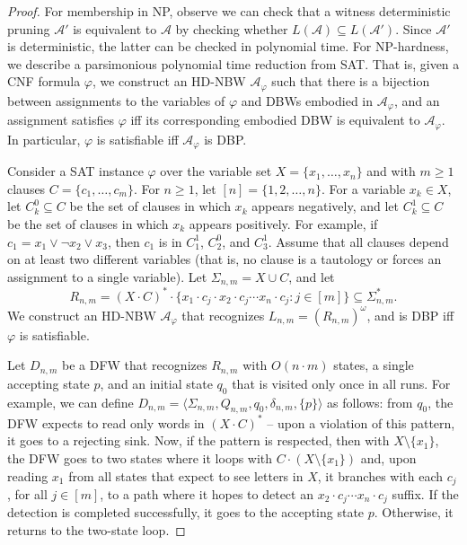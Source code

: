 \documentclass[10pt,a4paper]{amsart}
\theoremstyle{definition}
\numberwithin{equation}{section}
\newcommand{\A}{{\mathcal A}}
\begin{document}
\begin{proof}
For membership in NP, observe we can check that a witness deterministic pruning $\A'$ is equivalent to $\A$ by checking whether $L(\A)\subseteq L(\A')$. Since $\A'$ is deterministic, the latter can be checked in polynomial time. For NP-hardness, we describe a parsimonious polynomial time reduction from SAT. That is, given a CNF formula $\varphi$, we construct an HD-NBW $\A_\varphi$ such that there is a bijection between assignments to the variables of $\varphi$ and DBWs embodied in $\A_\varphi$, and an assignment satisfies $\varphi$ iff its corresponding embodied DBW is equivalent to $\A_\varphi$. In particular, $\varphi$ is satisfiable iff $\A_\varphi$ is DBP. 

Consider a SAT instance $\varphi$ over the variable set $X=\{x_1,\ldots,x_n\}$ and with $m\geq 1$ clauses $C=\{c_1,\ldots,c_m\}$. For $n \geq 1$, let $[n]=\{1,2,\ldots,n\}$. 
	For a variable $x_k \in X$, let $C^0_k \subseteq C$ be the set of clauses in which $x_k$ appears negatively, and let $C^1_k \subseteq C$ be the set of clauses in which $x_k$ appears positively. For example, if $c_1=x_1\lor \lnot x_2 \lor x_3$, then $c_1$ is in $C^1_1$, $C_2^0$, and $C^1_3$.
		Assume that all clauses depend on at least two different variables (that is, no clause is a tautology or forces an assignment to a single variable). Let $\Sigma_{n,m} = X\cup C$, and let $$R_{n,m} = (X\cdot C)^*\cdot \{x_1\cdot c_j\cdot x_2\cdot c_j\cdots x_n\cdot c_j : j\in [m]\} \subseteq \Sigma^*_{n,m}.$$
	We construct an HD-NBW $\A_\varphi$ that recognizes $L_{n,m} = (R_{n,m})^\omega$, and is DBP iff $\varphi$ is satisfiable. 

	
	Let $D_{n,m}$ be a DFW that recognizes $R_{n,m}$ with $O(n \cdot m)$ states, a single accepting state $p$, and an initial state $q_0$ that is visited only once in all runs.  For example, we can define $D_{n,m}=\langle \Sigma_{n,m}, Q_{n,m}, q_0, \delta_{n,m}, \{p\}\rangle$ as follows: from $q_0$, the DFW expects to read only words in $(X \cdot C)^*$ -- upon a violation of this pattern, it goes to a rejecting sink. Now, if the pattern is respected, then with $X \setminus \{x_1\}$, the DFW goes to two states where it loops with $C \cdot (X \setminus \{x_1\})$ and, upon reading $x_1$ from all states that expect to see letters in $X$, it branches with each $c_j$, for all $j \in [m]$, to a path where it hopes to detect an $x_2\cdot c_j\cdots x_n\cdot c_j$ suffix. 
	If the detection is completed successfully, it goes to the accepting state $p$. Otherwise, it returns to the two-state loop.



\end{proof}
\end{document}
